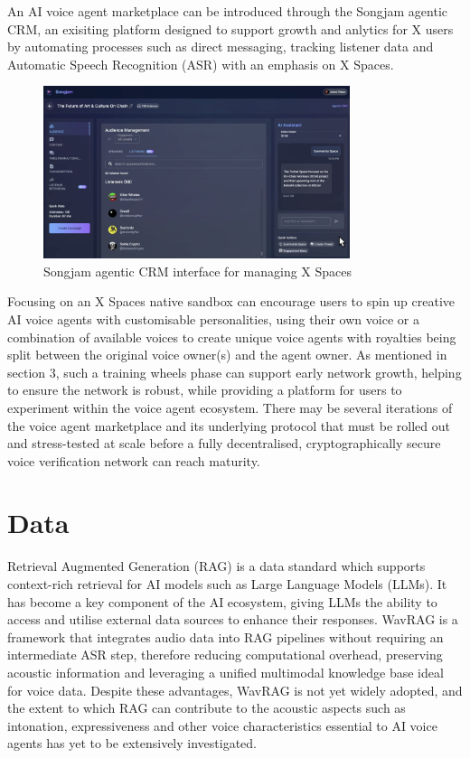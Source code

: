 \documentclass[11pt,a4paper]{article}
\begin{document}
An AI voice agent marketplace can be introduced through the Songjam agentic CRM, an exisiting platform designed to support growth and anlytics for X users by automating processes such as direct messaging, tracking listener data and Automatic Speech Recognition (ASR) with an emphasis on X Spaces.

\begin{figure}[H]
    \centering
    \includegraphics[width=0.8\textwidth]{crm.png}
    \caption{Songjam agentic CRM interface for managing X Spaces}
    \label{fig:crm}
\end{figure}

Focusing on an X Spaces native sandbox can encourage users to spin up creative AI voice agents with customisable personalities, using their own voice or a combination of available voices to create unique voice agents with royalties being split between the original voice owner(s) and the agent owner.
As mentioned in section 3, such a \textquotesingle training wheels\textquotesingle{} phase can support early network growth, helping to ensure the network is robust, while providing a platform for users to experiment within the voice agent ecosystem.
There may be several iterations of the voice agent marketplace and its underlying protocol that must be rolled out and stress-tested at scale before a fully decentralised, cryptographically secure voice verification network can reach maturity.

\section{Data}
\label{sec:data}
Retrieval Augmented Generation (RAG) is a data standard which supports context-rich retrieval for AI models such as Large Language Models (LLMs).
It has become a key component of the AI ecosystem, giving LLMs the ability to access and utilise external data sources to enhance their responses.
WavRAG \cite{chen2025wavrag} is a framework that integrates audio data into RAG pipelines without requiring an intermediate ASR step, therefore reducing computational overhead, preserving acoustic information and leveraging a unified multimodal knowledge base ideal for voice data.
Despite these advantages, WavRAG is not yet widely adopted, and the extent to which RAG can contribute to the acoustic aspects such as intonation, expressiveness and other voice characteristics essential to AI voice agents has yet to be extensively investigated.
\end{document}
